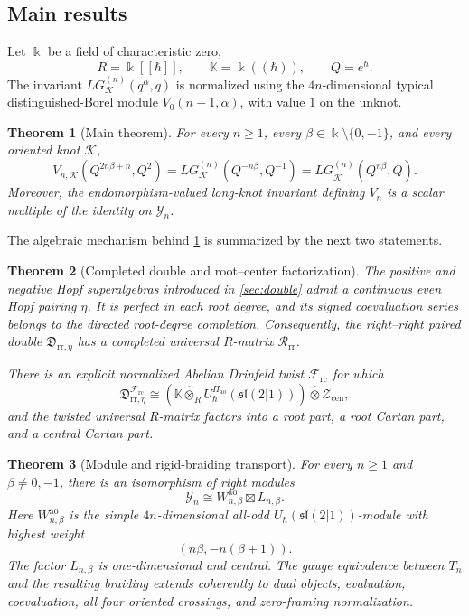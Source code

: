 \documentclass[11pt,a4paper]{article}
\newcommand{\kk}{\Bbbk}
\newcommand{\hK}{\mathbb K}
\newcommand{\hot}{\widehat\otimes}
\newcommand{\ao}{\mathrm{ao}}
\newcommand{\rc}{\mathrm{rc}}
\newcommand{\cen}{\mathrm{cen}}
\newtheorem{theorem}{Theorem}[section]
\theoremstyle{definition}
\theoremstyle{remark}
\begin{document}
\subsection{Main results}

Let \(\kk\) be a field of characteristic zero,
\[
 R=\kk[[\hbar]],\qquad \hK=\kk((\hbar)),\qquad Q=e^\hbar.
\]
The invariant \(LG_{\mathcal K}^{(n)}(q^\alpha,q)\) is normalized using the
\(4n\)-dimensional typical distinguished-Borel module
\(V_0(n-1,\alpha)\), with value \(1\) on the unknot.

\begin{theorem}[Main theorem]\label{thm:main}
For every \(n\geq 1\), every \(\beta\in\kk\setminus\{0,-1\}\), and every
oriented knot \(\mathcal K\),
\begin{equation}\label{eq:main}
 V_{n,\mathcal K}\!\left(Q^{2n\beta+n},Q^2\right)
 =
 LG_{\mathcal K}^{(n)}\!\left(Q^{-n\beta},Q^{-1}\right)
 =
 LG_{\overline{\mathcal K}}^{(n)}\!\left(Q^{n\beta},Q\right).
\end{equation}
Moreover, the endomorphism-valued long-knot invariant defining \(V_n\)
is a scalar multiple of the identity on \(\mathcal Y_n\).
\end{theorem}

The algebraic mechanism behind \cref{thm:main} is summarized by the next
two statements.

\begin{theorem}[Completed double and root--center factorization]
\label{thm:factorization}
The positive and negative Hopf superalgebras introduced in
\cref{sec:double} admit a continuous even Hopf pairing \(\eta\).  It is
perfect in each root degree, and its signed coevaluation series belongs
to the directed root-degree completion.  Consequently, the right--right
paired double \(\mathfrak D_{\mathrm{rr},\eta}\) has a completed universal
\(R\)-matrix \(\mathcal R_{\mathrm{rr}}\).

There is an explicit normalized Abelian Drinfeld twist
\(\mathcal F_{\rc}\) for which
\begin{equation}\label{eq:intro-factorization}
 \mathfrak D_{\mathrm{rr},\eta}^{\mathcal F_{\rc}}
 \cong
 \left(\hK\hot_R
 U_\hbar^{\Pi_{\ao}}(\mathfrak{sl}(2|1))\right)
 \hot\mathcal Z_{\cen},
\end{equation}
and the twisted universal \(R\)-matrix factors into a root part, a root
Cartan part, and a central Cartan part.
\end{theorem}

\begin{theorem}[Module and rigid-braiding transport]
\label{thm:transport-intro}
For every \(n\geq1\) and \(\beta\neq0,-1\), there is an isomorphism of
right modules
\[
 \mathcal Y_n\cong W_{n,\beta}^{\ao}\boxtimes L_{n,\beta}.
\]
Here \(W_{n,\beta}^{\ao}\) is the simple \(4n\)-dimensional all-odd
\(U_\hbar(\mathfrak{sl}(2|1))\)-module with highest weight
\[
 (n\beta,-n(\beta+1)).
\]
The factor \(L_{n,\beta}\) is one-dimensional and central.  The gauge
equivalence between \(T_n\) and the resulting braiding extends coherently
to dual objects, evaluation, coevaluation, all four oriented crossings,
and zero-framing normalization.
\end{theorem}
\end{document}

